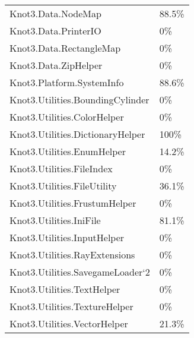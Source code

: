 \documentclass[a4paper,10pt]{article}
\begin{document}
\begin{longtable}[l]{ll}
Knot3.Data.NodeMap & 88.5\%\\
Knot3.Data.PrinterIO & 0\%\\
Knot3.Data.RectangleMap & 0\%\\
Knot3.Data.ZipHelper & 0\%\\
Knot3.Platform.SystemInfo & 88.6\%\\
Knot3.Utilities.BoundingCylinder & 0\%\\
Knot3.Utilities.ColorHelper & 0\%\\
Knot3.Utilities.DictionaryHelper & 100\%\\
Knot3.Utilities.EnumHelper & 14.2\%\\
Knot3.Utilities.FileIndex & 0\%\\
Knot3.Utilities.FileUtility & 36.1\%\\
Knot3.Utilities.FrustumHelper & 0\%\\
Knot3.Utilities.IniFile & 81.1\%\\
Knot3.Utilities.InputHelper & 0\%\\
Knot3.Utilities.RayExtensions & 0\%\\
Knot3.Utilities.SavegameLoader`2 & 0\%\\
Knot3.Utilities.TextHelper & 0\%\\
Knot3.Utilities.TextureHelper & 0\%\\
Knot3.Utilities.VectorHelper & 21.3\%\\
\end{longtable}
\end{document}

